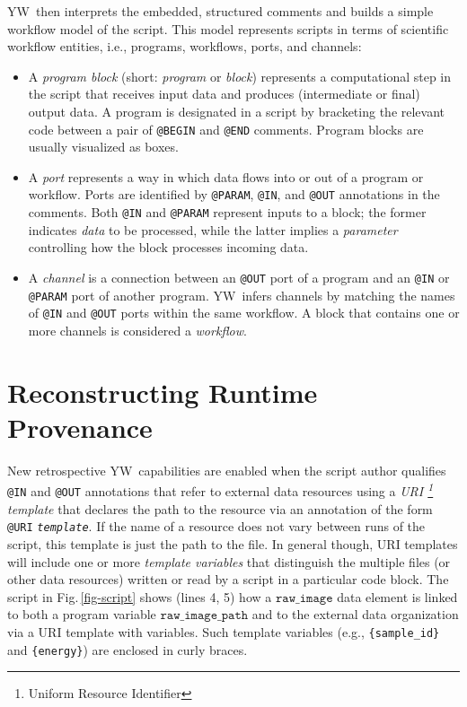 \documentclass[letterpaper,twocolumn,10pt]{article}
\newcommand{\figref}[1]{Fig.\,\ref{#1}}
\newcommand{\code}[1]{\ensuremath{\mathtt{#1}}}
\newcommand{\yw}{\textsf{YW}}
\newcommand{\ywa}[1]{\texttt{#1}}
\begin{document}
\yw\ then interprets the embedded, structured comments and builds a
simple workflow model of the script. This model represents scripts in
terms of scientific workflow entities, i.e., programs, workflows,
ports, and channels:

\begin{itemize}
\item A \emph{program block} (short: \emph{program} or \emph{block})
  represents a computational step in the script that receives input
  data and produces (intermediate or final) output data. A program is
  designated in a script by bracketing the relevant code between a
  pair of \ywa{@BEGIN} and \ywa{@END} comments. Program blocks are
  usually visualized as boxes. 
\item A \emph{port} represents a way in which data flows into or out
  of a program or workflow. Ports are identified by \ywa{@PARAM},
  \ywa{@IN}, and \ywa{@OUT} annotations in the comments.  Both
  \ywa{@IN} and \ywa{@PARAM} represent inputs to a block; the former
  indicates \emph{data} to be processed, while the latter implies a
  \emph{parameter} controlling how the block processes incoming data.
\item A \emph{channel} is a connection between an \ywa{@OUT} port of a
  program and an \ywa{@IN} or \ywa{@PARAM} port of another 
  program. \yw\ infers channels by matching the names of \ywa{@IN} and
  \ywa{@OUT} ports within the same workflow.  A block that contains
  one or more channels is considered a \emph{workflow}.
\end{itemize}


\section{Reconstructing Runtime Provenance}
\label{sec:reconstr-retr-prov}

New retrospective \yw\ capabilities are enabled when the script author
qualifies \ywa{@IN} and \ywa{@OUT} annotations that refer to external
data resources using a \emph{URI \footnote{Uniform Resource
    Identifier} template} that declares the path to the resource via
an annotation of the form
\ywa{@URI}\,\textvisiblespace\,\ywa{\emph{template}}.  If the name of
a resource does not vary between runs of the script, this template is
just the path to the file.  In general though, URI templates will
include one or more \emph{template variables} that distinguish the
multiple files (or other data resources) written or read by a script
in a particular code block.  The script in \figref{fig-script} shows
(lines 4, 5) how a \code{raw\_image} data element is linked to both a
program variable \code{raw\_image\_path} and to the external data
organization via a URI template with variables. Such template variables (e.g.,
\verb|{sample_id}| and \verb|{energy}|) are enclosed in curly braces.
\end{document}
